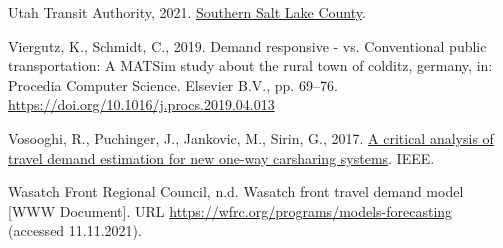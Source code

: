 \documentclass[
]{report}
\newlength{\cslhangindent}
\newlength{\cslentryspacingunit} %
\newenvironment{CSLReferences}[2] %
 {%
  \setlength{\parindent}{0pt}
  \ifodd #1
  \let\oldpar\par
  \def\par{\hangindent=\cslhangindent\oldpar}
  \fi
  \setlength{\parskip}{#2\cslentryspacingunit}
 }%
 {}
\begin{document}
\begin{CSLReferences}{1}{0}
\leavevmode{}%
Utah Transit Authority, 2021. \href{https://www.rideuta.com/Services/UTA-On-Demand/Southern-Salt-Lake-County}{{Southern Salt Lake County}}.

\leavevmode{}%
Viergutz, K., Schmidt, C., 2019. Demand responsive - vs. Conventional public transportation: A MATSim study about the rural town of colditz, germany, in: Procedia Computer Science. Elsevier B.V., pp. 69--76. \url{https://doi.org/10.1016/j.procs.2019.04.013}

\leavevmode{}%
Vosooghi, R., Puchinger, J., Jankovic, M., Sirin, G., 2017. \href{https://hal.archives-ouvertes.fr/hal-01622293}{A critical analysis of travel demand estimation for new one-way carsharing systems}. IEEE.

\leavevmode{}%
Wasatch Front Regional Council, n.d. Wasatch front travel demand model {[}WWW Document{]}. URL \url{https://wfrc.org/programs/models-forecasting} (accessed 11.11.2021).

\end{CSLReferences}
\end{document}
